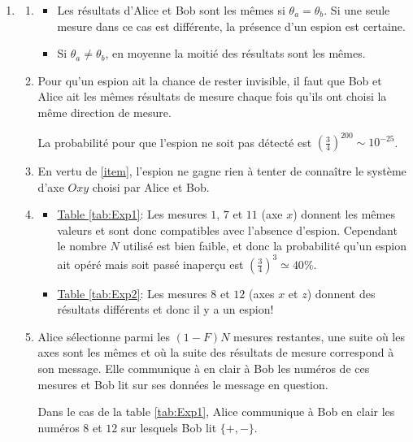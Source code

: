 \begin{enumerate}
\item 
\begin{enumerate}
 \item \begin{itemize}
        \item Les résultats d'Alice et Bob sont les mêmes si
$\theta_a=\theta_b$. Si une seule mesure dans ce cas est différente, la
présence d'un espion est certaine.
\item Si $\theta_a\neq\theta_b$, en moyenne la moitié des résultats sont les
mêmes.
       \end{itemize}


 \item Pour qu'un espion ait la chance de rester invisible, il faut que Bob et
Alice ait les mêmes résultats de mesure chaque fois qu'ils ont choisi la même
direction de mesure.

La probabilité pour que l'espion ne soit pas détecté est 
$\left(\frac{3}{4}\right)^{200}\sim10^{-25}$.

\item En vertu de \ref{item}, l'espion ne gagne rien à tenter de connaître le
système d'axe $Oxy$ choisi par Alice et Bob.

\item \begin{itemize}
       \item \underline{Table \ref{tab:Exp1}}: Les mesures $1$, $7$ et $11$ (axe
$x$) donnent les mêmes valeurs et sont donc compatibles avec l'absence d'espion.
Cependant le nombre $N$ utilisé est bien faible, et donc la probabilité qu'un
espion ait opéré mais soit passé inaperçu est
$\left(\frac{3}{4}\right)^{3}\simeq 40\%$.
       \item \underline{Table \ref{tab:Exp2}}: Les mesures $8$ et $12$ (axes $x$
et $z$) donnent des résultats différents et donc il y a un espion!
      \end{itemize}

\item Alice sélectionne parmi les $(1-F)N$ mesures restantes, une suite où les
axes sont les mêmes et où la suite des résultats de mesure correspond à son
message. Elle communique à en clair à Bob les numéros de ces mesures et Bob
lit sur ses données le message en question.

Dans le cas de la  table \ref{tab:Exp1}, Alice communique à Bob en clair les
numéros $8$ et $12$ sur lesquels Bob lit $\{+,-\}$.
\end{enumerate}

\end{enumerate}

